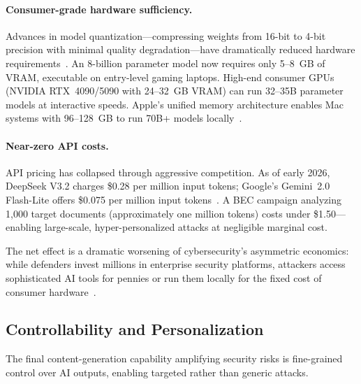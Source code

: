 \paragraph{Consumer-grade hardware sufficiency.}
Advances in model quantization---compressing weights from 16-bit to 4-bit precision with minimal quality degradation---have dramatically reduced hardware requirements~\cite{localai2026}. An 8-billion parameter model now requires only 5--8~GB of VRAM, executable on entry-level gaming laptops. High-end consumer GPUs (NVIDIA RTX~4090/5090 with 24--32~GB VRAM) can run 32--35B parameter models at interactive speeds. Apple's unified memory architecture enables Mac systems with 96--128~GB to run 70B+ models locally~\cite{sitepoint2026mac}.

\paragraph{Near-zero API costs.}
API pricing has collapsed through aggressive competition. As of early 2026, DeepSeek V3.2 charges \$0.28 per million input tokens; Google's Gemini~2.0 Flash-Lite offers \$0.075 per million input tokens~\cite{tldl2026pricing}. A BEC campaign analyzing 1,000 target documents (approximately one million tokens) costs under \$1.50---enabling large-scale, hyper-personalized attacks at negligible marginal cost.

The net effect is a dramatic worsening of cybersecurity's asymmetric economics: while defenders invest millions in enterprise security platforms, attackers access sophisticated AI tools for pennies or run them locally for the fixed cost of consumer hardware~\cite{zensec2025phishing}.


\subsection{Controllability and Personalization}
\label{sec:cap-control}

The final content-generation capability amplifying security risks is fine-grained control over AI outputs, enabling targeted rather than generic attacks.

